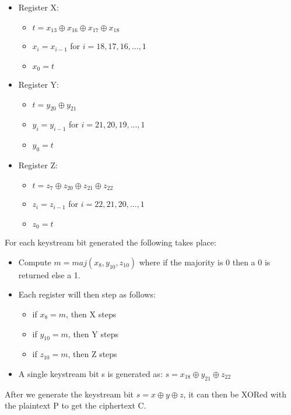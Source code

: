 \documentclass[a4paper]{article}
\begin{document}
\begin{itemize}
    \item Register X:
    \begin{itemize}[noitemsep,nolistsep]
        \item $t = x_{13} \oplus x_{16} \oplus x_{17} \oplus x_{18}$
        \item $x_i = x_{i-1}$ for $i = 18,17,16,...,1$
        \item $x_0 = t$
    \end{itemize}
    \item Register Y:
    \begin{itemize}[noitemsep,nolistsep]
        \item $t = y_{20} \oplus y_{21}$
        \item $y_i = y_{i-1}$ for $i = 21,20,19,...,1$
        \item $y_0 = t$
    \end{itemize}
    \item Register Z:
    \begin{itemize}[noitemsep,nolistsep]
        \item $t = z_{7} \oplus z_{20} \oplus z_{21} \oplus z_{22}$
        \item $z_i = z_{i-1}$ for $i = 22,21,20,...,1$
        \item $z_0 = t$
    \end{itemize}
\end{itemize}

For each keystream bit generated the following takes place:
\begin{itemize}
    \item Compute $m = maj(x_8,y_{10},z_{10})$ where if the majority is 0 then a 0 is returned else a 1.
    \item Each register will then step as follows:
    \begin{itemize}[noitemsep,nolistsep]
        \item if $x_8 = m$, then X steps
        \item if $y_{10} = m$, then Y steps
        \item if $z_{10} = m$, then Z steps
    \end{itemize}
    \item A single keystream bit s is generated as: $s = x_{18} \oplus y_{21} \oplus z_{22}$
\end{itemize}

After we generate the keystream bit $s = x \oplus y \oplus z$, it can then be XORed with the plaintext P to get the ciphertext C.
\end{document}

